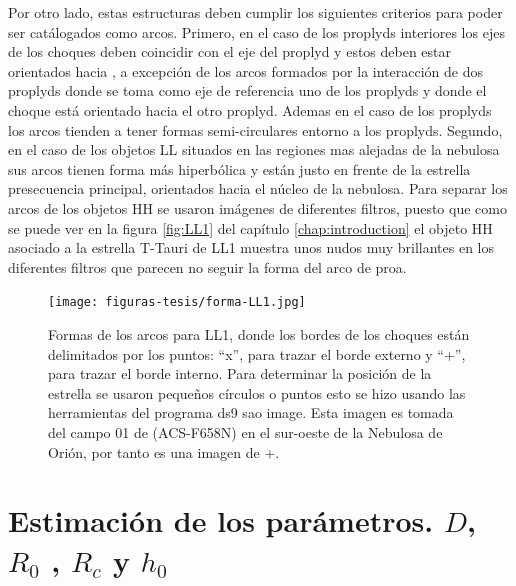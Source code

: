 Por otro lado, estas estructuras deben cumplir los siguientes criterios para poder ser catálogados como arcos. Primero, en el caso de los proplyds interiores los ejes de los choques deben coincidir con el eje del proplyd y estos deben estar orientados hacia \thC, a excepción de los arcos formados por la interacción de dos proplyds donde se toma como eje de referencia uno de los proplyds y donde el choque está orientado hacia el otro proplyd. Ademas en el caso de los proplyds los arcos tienden a tener formas  semi-circulares entorno a los proplyds. Segundo, en el caso de los objetos LL situados en las regiones mas alejadas de la nebulosa sus arcos tienen forma más hiperbólica y están justo en frente de la estrella presecuencia principal, orientados hacia el núcleo de la nebulosa.  Para separar los arcos de los objetos HH se usaron imágenes de diferentes filtros, puesto que como se puede ver en la figura \ref{fig:LL1} del capítulo \ref{chap:introduction} el objeto HH asociado a la estrella T-Tauri de LL1 muestra unos nudos muy brillantes en los diferentes filtros que parecen no seguir la forma del arco de proa. 


\begin{figure}
  \centering
   \texttt{[image: figuras-tesis/forma-LL1.jpg]}
  \caption{Formas de los arcos para LL1, donde los bordes de los choques están delimitados por los puntos: ``x'', para trazar el borde externo y ``+'', para trazar el borde interno. Para determinar la posición de la estrella se usaron pequeños círculos o puntos esto se hizo usando las herramientas del programa ds9 sao image. Esta imagen es tomada del campo 01 de \citet{Bally:2006a} (ACS-F658N) en el sur-oeste de la Nebulosa de Orión, por tanto es una imagen de \ha{}+\nii{}. }
  \label{fig:arco-LL1}
\end{figure}

\section{Estimación de los parámetros. \(D\), \(R_{0}\) , \(R_{c}\) y \(h_{0}\) }
\label{sec:parametros}

